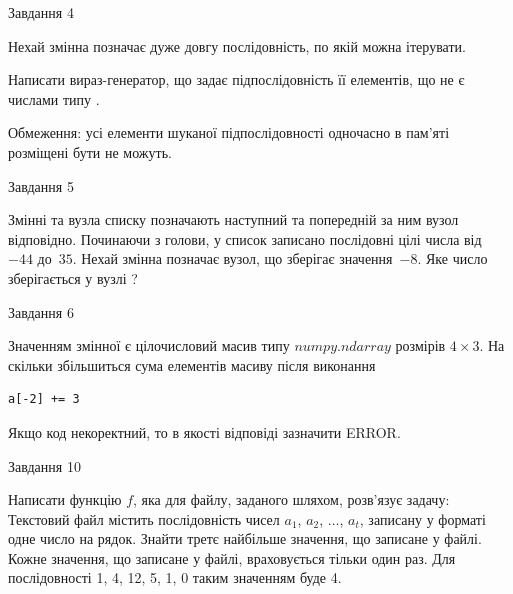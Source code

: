 \documentclass[12pt, ukrainian]{article}
\begin{document}
{               
{\begin{center}Завдання {4}\end{center}}
\vspace{-6mm}
Нехай змінна  позначає дуже довгу послідовність, по якій можна ітерувати.

Написати вираз-генератор, що задає підпослідовність її елементів, що не є числами типу .

Обмеження: усі елементи шуканої підпослідовності одночасно в пам'яті розміщені бути не можуть.\par

\vspace{10mm}
               
{\begin{center}Завдання {5}\end{center}}
\vspace{-6mm}
Змінні  та  вузла списку позначають наступний та попередній за ним вузол відповідно. Починаючи з голови, у список записано послідовні цілі числа від~$-44$ до~$35$. Нехай змінна  позначає вузол, що зберігає значення~$-8$.
Яке число зберігається у вузлі  ?\par

               
{\begin{center}Завдання {6}\end{center}}
\vspace{-6mm}
Значенням змінної  є цілочисловий масив типу $numpy.ndarray$ розмірів $4{\times}3$. На скільки збільшиться сума елементів масиву  після виконання
\begin{verbatim}
a[-2] += 3
\end{verbatim}


Якщо код некоректний, то в якості відповіді зазначити ERROR.\par

               
{\begin{center}Завдання {10}\end{center}}
\vspace{-6mm}

Написати функцію $f$, яка для файлу, заданого шляхом, розв’язує задачу:\\ Текстовий файл містить послідовність чисел $a_1$, $a_2$, $\ldots$, $a_t$, записану у форматі одне число на рядок. Знайти третє найбільше значення, що записане у файлі. Кожне значення, що записане у файлі, враховується тільки один раз. Для послідовності 1, 4, 12, 5, 1, 0 таким значенням буде 4.

}
\end{document}
